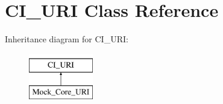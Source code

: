 \hypertarget{class_c_i___u_r_i}{}\section{C\+I\+\_\+\+U\+R\+I Class Reference}
\label{class_c_i___u_r_i}
Inheritance diagram for C\+I\+\_\+\+U\+R\+I\+:\begin{figure}[H]
\begin{center}
\leavevmode
\includegraphics[height=2.000000cm]{class_c_i___u_r_i}
\end{center}
\end{figure}
